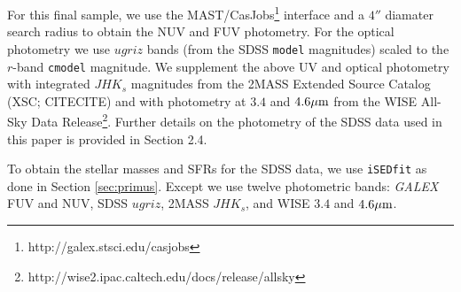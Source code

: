 \documentclass{emulateapj}
\begin{document}
For this final sample, we use the MAST/CasJobs\footnote{http://galex.stsci.edu/casjobs} interface and a $4''$ diamater search radius to obtain the NUV and FUV photometry. 
For the optical photometry we use $ugriz$ bands (from the SDSS \texttt{model} magnitudes) scaled to the $r$-band \texttt{cmodel} magnitude. 
We supplement the above UV and optical photometry with integrated $JHK_s$ magnitudes from the 2MASS Extended Source Catalog (XSC; CITECITE) and with photometry at $3.4$ 
and $4.6 \mu \rm{m}$ from the WISE All-Sky Data Release\footnote{http://wise2.ipac.caltech.edu/docs/release/allsky}. 
Further details on the photometry of the SDSS data used in this paper is provided in \cite{Moustakas:2013aa} Section 2.4. 

To obtain the stellar masses and SFRs for the SDSS data, we use \texttt{iSEDfit} as done in Section \ref{sec:primus}. 
Except we use twelve photometric bands: {\em GALEX} FUV and NUV, SDSS $ugriz$, 2MASS $JHK_{s}$, and WISE $3.4$ and $4.6 \mu \rm{m}$. 
\end{document}
